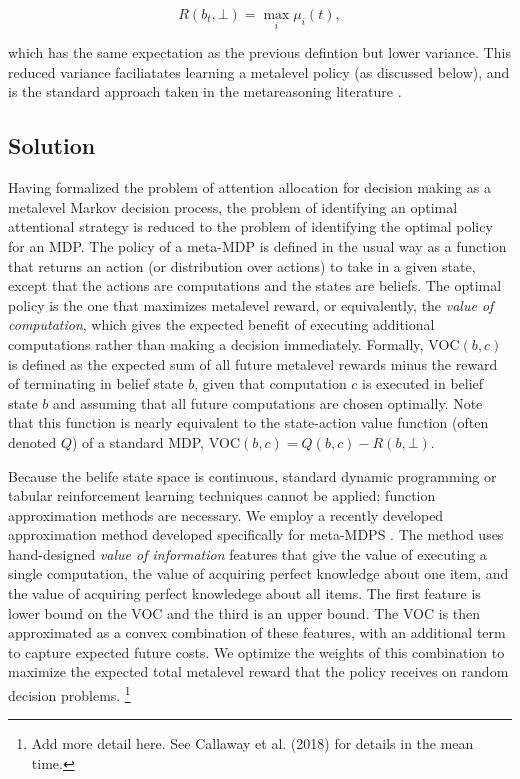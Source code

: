\documentclass[12pt,a4paperpaper,]{article}
\begin{document}
\begin{equation}
R(b_t, \bot) = \max_i \mu_i(t)
, 
\end{equation}

which has the same expectation as the previous defintion but lower variance. This reduced variance faciliatates learning a metalevel policy (as discussed below), and is the standard approach taken in the metareasoning literature \citep{Hay2012}.


\subsection{Solution}
Having formalized the problem of attention allocation for decision making as a metalevel Markov decision process, the problem of identifying an optimal attentional strategy is reduced to the problem of identifying the optimal policy for an MDP. The policy of a meta-MDP is defined in the usual way as a function that returns an action (or distribution over actions) to take in a given state, except that the actions are computations and the states are beliefs. The optimal policy is the one that maximizes metalevel reward, or equivalently, the \emph{value of computation}, which gives the expected benefit of executing additional computations rather than making a decision immediately. Formally, $\text{VOC}(b, c)$ is defined as the expected sum of all future metalevel rewards minus the reward of terminating in belief state $b$, given that computation $c$ is executed in belief state $b$ and assuming that all future computations are chosen optimally. Note that this function is nearly equivalent to the state-action value function (often denoted $Q$) of a standard MDP, $\text{VOC}(b, c) = Q(b, c) - R(b, \bot)$.

Because the belife state space is continuous, standard dynamic programming or tabular reinforcement learning techniques cannot be applied; function approximation methods are necessary. We employ a recently developed approximation method developed specifically for meta-MDPS \citep{callaway2018learning}. The method uses hand-designed \emph{value of information} features that give the value of executing a single computation, the value of acquiring perfect knowledge about one item, and the value of acquiring perfect knowledege about all items. The first feature is lower bound on the VOC and the third is an upper bound. The VOC is then approximated as a convex combination of these features, with an additional term to capture expected future costs. We optimize the weights of this combination to maximize the expected total metalevel reward that the policy receives on random decision problems.%
  \footnote{Add more detail here. See Callaway et al. (2018) for details in the mean time.}
\end{document}
